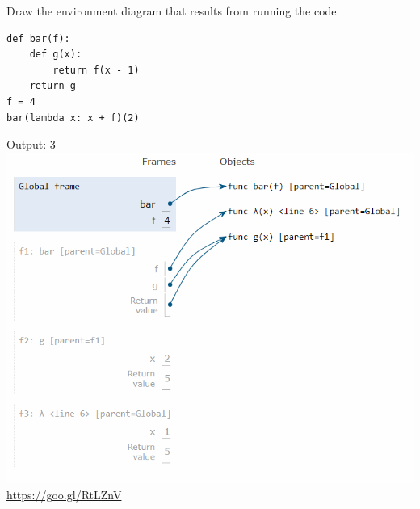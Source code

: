\begin{blocksection}
\question Draw the environment diagram that results from running the code.

\begin{lstlisting}
def bar(f):
    def g(x):
        return f(x - 1)
    return g
f = 4
bar(lambda x: x + f)(2)
\end{lstlisting}

\begin{solution}[0.3in]
Output: 3 \newline
\includegraphics[scale=0.5]{foobar3.png}
\newline
\url{https://goo.gl/RtLZnV}
\end{solution}
\end{blocksection}
